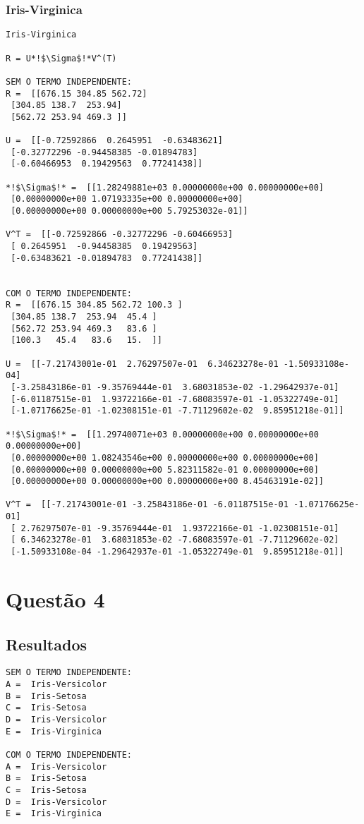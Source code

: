 \documentclass[a4paper,12pt,twoside]{article}
\begin{document}
\subsubsection{Iris-Virginica}
\begin{lstlisting}
Iris-Virginica

R = U*!$\Sigma$!*V^(T)

SEM O TERMO INDEPENDENTE: 
R =  [[676.15 304.85 562.72]
 [304.85 138.7  253.94]
 [562.72 253.94 469.3 ]]

U =  [[-0.72592866  0.2645951  -0.63483621]
 [-0.32772296 -0.94458385 -0.01894783]
 [-0.60466953  0.19429563  0.77241438]]

*!$\Sigma$!* =  [[1.28249881e+03 0.00000000e+00 0.00000000e+00]
 [0.00000000e+00 1.07193335e+00 0.00000000e+00]
 [0.00000000e+00 0.00000000e+00 5.79253032e-01]]

V^T =  [[-0.72592866 -0.32772296 -0.60466953]
 [ 0.2645951  -0.94458385  0.19429563]
 [-0.63483621 -0.01894783  0.77241438]]


COM O TERMO INDEPENDENTE: 
R =  [[676.15 304.85 562.72 100.3 ]
 [304.85 138.7  253.94  45.4 ]
 [562.72 253.94 469.3   83.6 ]
 [100.3   45.4   83.6   15.  ]]

U =  [[-7.21743001e-01  2.76297507e-01  6.34623278e-01 -1.50933108e-04]
 [-3.25843186e-01 -9.35769444e-01  3.68031853e-02 -1.29642937e-01]
 [-6.01187515e-01  1.93722166e-01 -7.68083597e-01 -1.05322749e-01]
 [-1.07176625e-01 -1.02308151e-01 -7.71129602e-02  9.85951218e-01]]

*!$\Sigma$!* =  [[1.29740071e+03 0.00000000e+00 0.00000000e+00 0.00000000e+00]
 [0.00000000e+00 1.08243546e+00 0.00000000e+00 0.00000000e+00]
 [0.00000000e+00 0.00000000e+00 5.82311582e-01 0.00000000e+00]
 [0.00000000e+00 0.00000000e+00 0.00000000e+00 8.45463191e-02]]

V^T =  [[-7.21743001e-01 -3.25843186e-01 -6.01187515e-01 -1.07176625e-01]
 [ 2.76297507e-01 -9.35769444e-01  1.93722166e-01 -1.02308151e-01]
 [ 6.34623278e-01  3.68031853e-02 -7.68083597e-01 -7.71129602e-02]
 [-1.50933108e-04 -1.29642937e-01 -1.05322749e-01  9.85951218e-01]]
\end{lstlisting}

\section{Questão 4}
\subsection{Resultados}
\begin{lstlisting}
SEM O TERMO INDEPENDENTE: 
A =  Iris-Versicolor
B =  Iris-Setosa
C =  Iris-Setosa
D =  Iris-Versicolor
E =  Iris-Virginica

COM O TERMO INDEPENDENTE: 
A =  Iris-Versicolor
B =  Iris-Setosa
C =  Iris-Setosa
D =  Iris-Versicolor
E =  Iris-Virginica
\end{lstlisting}
\end{document}
